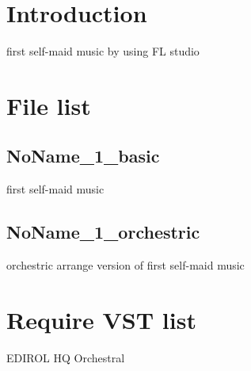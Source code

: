 \documentclass{article}
\author{Seycho Han}
\date{XX XX 2012}
\begin{document}
\section{Introduction}
first self-maid music by using FL studio \cite{flstudio}
\\
\section{File list}
\subsection{NoName\_1\_basic}
first self-maid music
\subsection{NoName\_1\_orchestric}
orchestric arrange version of first self-maid music
\\

\section{Require VST list}
EDIROL HQ Orchestral \cite{edirol}
\\



\end{document}
